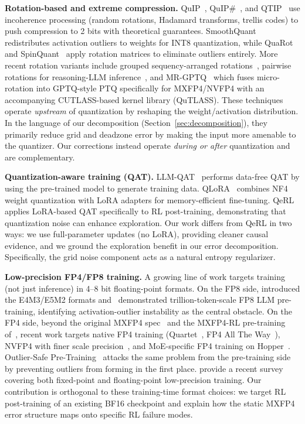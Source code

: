 \documentclass{article}
\theoremstyle{definition}
\theoremstyle{remark}
\begin{document}
\textbf{Rotation-based and extreme compression.}
QuIP~\citep{chee2023quip}, QuIP\#~\citep{tseng2024quipsharp}, and QTIP~\citep{tseng2024qtip} use incoherence processing (random rotations, Hadamard transforms, trellis codes) to push compression to 2 bits with theoretical guarantees. SmoothQuant~\citep{xiao2023smoothquant} redistributes activation outliers to weights for INT8 quantization, while QuaRot~\citep{ashkboos2024quarot} and SpinQuant~\citep{liu2025spinquant} apply rotation matrices to eliminate outliers entirely. More recent rotation variants include grouped sequency-arranged rotations~\citep{choi2025rgsr}, pairwise rotations for reasoning-LLM inference~\citep{liang2025paroquant}, and MR-GPTQ~\citep{egiazarian2026mrgptq} which fuses micro-rotation into GPTQ-style PTQ specifically for MXFP4/NVFP4 with an accompanying CUTLASS-based kernel library (QuTLASS). These techniques operate \emph{upstream} of quantization by reshaping the weight/activation distribution. In the language of our decomposition (Section~\ref{sec:decomposition}), they primarily reduce grid and deadzone error by making the input more amenable to the quantizer. Our corrections instead operate \emph{during or after} quantization and are complementary.

\textbf{Quantization-aware training (QAT).}
LLM-QAT~\citep{liu2024llmqat} performs data-free QAT by using the pre-trained model to generate training data. QLoRA~\citep{dettmers2023qlora} combines NF4 weight quantization with LoRA adapters for memory-efficient fine-tuning. QeRL~\citep{huang2025qerl} applies LoRA-based QAT specifically to RL post-training, demonstrating that quantization noise can enhance exploration. Our work differs from QeRL in two ways: we use full-parameter updates (no LoRA), providing cleaner causal evidence, and we ground the exploration benefit in our error decomposition. Specifically, the grid noise component acts as a natural entropy regularizer.

\textbf{Low-precision FP4/FP8 training.}
A growing line of work targets training (not just inference) in 4--8 bit floating-point formats. On the FP8 side, \citet{micikevicius2022fp8} introduced the E4M3/E5M2 formats and~\citet{fishman2025fp8scaling,hernandezcano2025fp8gemm} demonstrated trillion-token-scale FP8 LLM pre-training, identifying activation-outlier instability as the central obstacle. On the FP4 side, beyond the original MXFP4 spec~\citep{rouhani2023ocp} and the MXFP4-RL pre-training of~\citet{tseng2025trainingllmsmxfp4}, recent work targets native FP4 training (Quartet~\citep{castro2025quartet}, FP4 All The Way~\citep{chmiel2025fp4allway}), NVFP4 with finer scale precision~\citep{nvidia2025nvfp4,panferov2026quartet2,cook2025fouroversix}, and MoE-specific FP4 training on Hopper~\citep{zhang2026practicalfp4moe}. Outlier-Safe Pre-Training~\citep{park2025osp} attacks the same problem from the pre-training side by preventing outliers from forming in the first place. \citet{hao2025lowprectraining} provide a recent survey covering both fixed-point and floating-point low-precision training. Our contribution is orthogonal to these training-time format choices: we target RL post-training of an existing BF16 checkpoint and explain how the static MXFP4 error structure maps onto specific RL failure modes.
\end{document}
